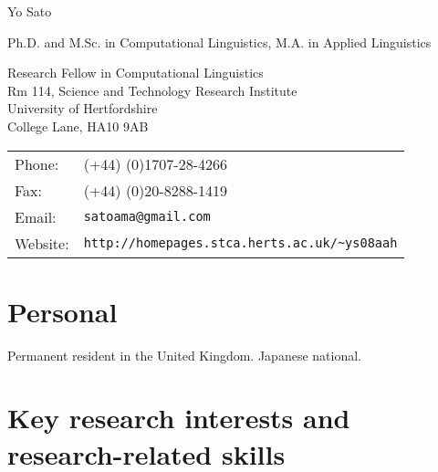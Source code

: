 \documentclass[a4paper]{article}
\def\name{Yo Sato}
\renewenvironment{itemize}{
  \begin{list}{}{
    \setlength{\leftmargin}{1.5em}
  }
}{
  \end{list}
}
\begin{document}
{\huge \name}

\smallskip

Ph.D. and M.Sc. in Computational Linguistics, M.A. in Applied Linguistics


\vspace{0.25in}

\begin{minipage}{0.5\linewidth}
  Research Fellow in Computational Linguistics\\
  Rm 114, Science and Technology Research Institute \\
  University of Hertfordshire \\
  College Lane, HA10 9AB
\end{minipage}
\begin{minipage}{0.45\linewidth}
  \begin{tabular}{ll}
    Phone: & (+44) (0)1707-28-4266 \\
    Fax: &  (+44) (0)20-8288-1419 \\
    Email: & {\tt satoama@gmail.com} \\
    Website: & {\tt\small http://homepages.stca.herts.ac.uk/\textasciitilde{}ys08aah} \\
  \end{tabular}
\end{minipage}

\section*{Personal}

\begin{itemize}
\item Permanent resident in the United Kingdom. Japanese national.
\end{itemize}

\section*{Key research interests and research-related skills}
\end{document}
